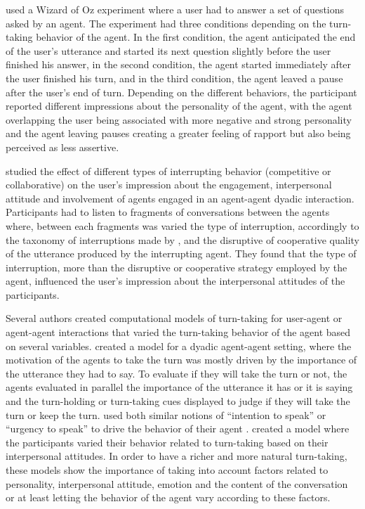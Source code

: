 \cite{ter_maat_how_2010} used a Wizard of Oz experiment where a user had to answer a set of questions asked by an agent. The experiment had three conditions depending on the turn-taking behavior of the agent. In the first condition, the agent anticipated the end of the user's utterance and started its next question slightly before the user finished his answer, in the second condition, the agent started immediately after the user finished his turn, and in the third condition, the agent leaved a pause after the user's end of turn. Depending on the different behaviors, the participant reported different impressions about the personality of the agent, with the agent overlapping the user being associated with more negative and strong personality and the agent leaving pauses creating a greater feeling of rapport but also being perceived as less assertive.  

\cite{cafaro_effects_2016} studied the effect of different types of interrupting behavior (competitive or collaborative) on the user's impression about the engagement, interpersonal attitude and involvement of agents engaged in an agent-agent dyadic interaction. Participants had to listen to fragments of conversations between the agents where, between each fragments was varied the type of interruption, accordingly to the taxonomy of interruptions made by \citep{beattie_interruption_1981}, and the disruptive of cooperative quality of the utterance produced by the interrupting agent. They found that the type of interruption, more than the disruptive or cooperative strategy employed by the agent, influenced the user's impression about the interpersonal attitudes of the participants. 

Several authors created computational models of turn-taking for user-agent or agent-agent interactions that varied the turn-taking behavior of the agent based on several variables. \cite{selfridge_bidding_2009} created a model for a dyadic agent-agent setting, where the motivation of the agents to take the turn was mostly driven by the importance of the utterance they had to say. To evaluate if they will take the turn or not, the agents evaluated in parallel the importance of the utterance it has or it is saying and the turn-holding or turn-taking cues displayed to judge if they will take the turn or keep the turn. 
\cite{lessmann_towards_2004,thorisson_multiparty_2010} used both similar notions of ``intention to speak'' \citep{lessmann_towards_2004} or ``urgency to speak'' to drive the behavior of their agent \citep{thorisson_multiparty_2010}. 
\cite{ravenet_conversational_2015} created a model where the participants varied their behavior related to turn-taking based on their interpersonal attitudes. 
In order to have a richer and more natural turn-taking, these models show the importance of taking into account factors related to personality, interpersonal attitude, emotion and the content of the conversation or at least letting the behavior of the agent vary according to these factors. 

